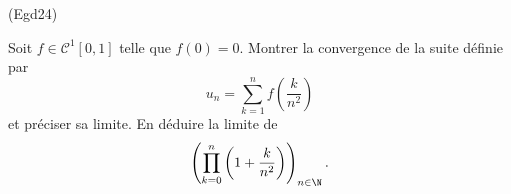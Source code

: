 \begin{tiny}(Egd24)\end{tiny} Soit $f\in \mathcal{C}^1[0,1]$ telle que $f(0)=0$. Montrer la convergence de la suite définie par 
\begin{displaymath}
 u_n = \sum_{k=1}^nf(\frac{k}{n^2})
\end{displaymath}
et préciser sa limite. En déduire la limite de
 \[
  \left( \prod_{k=0}^{n} \left( 1 + \frac{k}{n^2}\right)  \right)_{n \in \N}.
 \]
